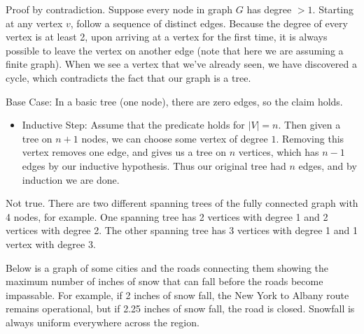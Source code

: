 \documentclass[solution, letterpaper]{cs20}
\begin{document}
\begin{solution}
\subsolution Proof by contradiction. Suppose every node in graph $G$ has degree $> 1$. Starting at any vertex $v$, follow a sequence of distinct edges. Because the degree of every vertex is at least 2, upon arriving at a vertex for the first time, it is always possible to leave the vertex on another edge (note that here we are assuming a finite graph). When we see a vertex that we've already seen, we have discovered a cycle, which contradicts the fact that our graph is a tree.

\subsolution Base Case: In a basic tree (one node), there are zero edges, so the claim holds. 
\begin{itemize}
\item[] Inductive Step: Assume that the predicate holds for $|V|=n.$ Then given a tree on $n+1$ nodes, we can choose some vertex of degree $1$.  Removing this vertex removes one edge, and gives us a tree on $n$ vertices, which has $n-1$ edges by our inductive hypothesis. Thus our original tree had $n$ edges, and by induction we are done.  
\end{itemize}

\subsolution Not true. There are two different spanning trees of the fully connected graph with 4 nodes, for example. One spanning tree has 2 vertices with degree 1 and 2 vertices with degree 2. The other spanning tree has 3 vertices with degree 1 and 1 vertex with degree 3.

\end{solution}



Below is a graph of some cities and the roads connecting them showing the maximum number of inches of snow that can fall before the roads become impassable. For example, if 2 inches of snow fall, the New York to Albany route remains operational, but if 2.25 inches of snow fall, the road is closed. Snowfall is always uniform everywhere across the region.

\medskip
\end{document}
